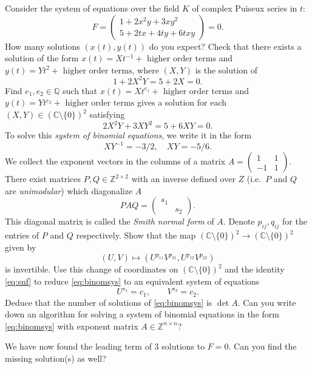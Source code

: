 \documentclass[11pt,reqno]{amsart}
\theoremstyle{definition}
\theoremstyle{remark}
\numberwithin{equation}{section}
\begin{document}
Consider the system of equations over the field $K$ of complex Puiseux series in $t$:
$$
F = \begin{pmatrix} 1 + 2 x^2 y + 3 xy^2  \\
5 + 2 tx  + 4 ty + 6 txy \end{pmatrix} = 0.
$$
How many solutions $(x(t),y(t))$ do you expect? Check that there exists a solution of the form $x(t) = X t^{-1} + \text{ higher order terms}$ and $y(t) = Y t^2 + \text{ higher order terms}$, where $(X,Y)$ is the solution of 
$$ 1 + 2 X^2Y = 5 + 2X = 0 .$$
Find $e_1, e_2 \in \mathbb{Q}$ such that $x(t) = X t^{e_1} +  \text{ higher order terms}$ and $y(t) = Y t^{e_2} + \text{ higher order terms}$ gives a solution for each $(X,Y) \in (\mathbb{C} \setminus \{0\})^2$ satisfying
$$ 2 X^2 Y + 3 XY^2 = 5 + 6 XY = 0.$$
To solve this \emph{system of binomial equations}, we write it in the form 
\begin{equation} \label{eq:binomsys}
XY^{-1} = -3/2, \quad XY = -5/6.
\end{equation}
We collect the exponent vectors in the columns of a matrix $A = \begin{pmatrix}
1 & 1 \\ -1 & 1
\end{pmatrix}$. There exist matrices $P, Q \in \mathbb{Z}^{2 \times 2}$ with an inverse defined over $Z$ (i.e.~$P$ and $Q$ are \emph{unimodular}) which diagonalize $A$
\begin{equation} \label{eq:snf}
P A Q = \begin{pmatrix}
s_1 & \\ 
& s_2
\end{pmatrix}.
\end{equation}
This diagonal matrix is called the \emph{Smith normal form} of $A$. Denote $p_{ij}, q_{ij}$ for the entries of $P$ and $Q$ respectively. Show that the map $ (\mathbb{C} \setminus \{0\})^2 \rightarrow (\mathbb{C} \setminus \{0\})^2 $ given by 
$$ (U,V) \mapsto (U^{p_{11}} V^{p_{21}}, U^{p_{12}} V^{p_{22}})$$
is invertible. Use this change of coordinates on $(\mathbb{C} \setminus \{0\})^2$ and the identity \eqref{eq:snf} to reduce \eqref{eq:binomsys} to an equivalent system of equations 
$$ U^{s_1} = c_1, \qquad V^{s_2} = c_2.$$
Deduce that the number of solutions of \eqref{eq:binomsys} is $\det A$. Can you write down an algorithm for solving a system of binomial equations in the form \eqref{eq:binomsys} with exponent matrix $A \in \mathbb{Z}^{n \times n}$?

We have now found the leading term of 3 solutions to $F = 0$. Can you find the missing solution(s) as well? 
\end{document}
